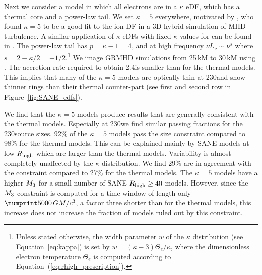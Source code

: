 Next we consider a model in which all electrons are in a $\kappa$ eDF, which has a thermal core and a power-law tail.
We set $\kappa = 5$ everywhere,  motivated by \citet{2016PhRvL.117w5101K}, who found $\kappa = 5$ to be a good fit to the ion DF in a 3D hybrid simulation of MHD turbulence.
A similar application of $\kappa$ eDFs with fixed $\kappa$ values for \sgra can be found in \citet{davelaar2018}.
The power-law tail has $p = \kappa - 1 = 4$, and at high frequency $\nu L_\nu \sim \nu^s$ where $s = 2 - \kappa/2 = -1/2$.\footnote{Unless stated otherwise, the width parameter $w$ of the $\kappa$ distribution (see Equation~\ref{eq:kappa}) is set by $w = (\kappa - 3) \Theta_e/\kappa$, where the dimensionless electron temperature $\Theta_e$ is computed according to Equation~(\ref{eq:rhigh_prescription}).}
We image \bhac GRMHD simulations from 25\,kM to 30\,kM using \bhoss \citep{Younsi2012,Younsi2020}.
The accretion rate required to obtain 2.4\Jy is smaller than for the thermal models.
This implies that many of the $\kappa=5$ models are optically thin at 230\GHz and show thinner rings than their thermal counter-part (see first and second row in Figure~\ref{fig:SANE_edfs}).


We find that the $\kappa=5$ models produce results that are generally consistent with the \bhac thermal models.
Especially at 230\GHz we find similar passing fractions for the 230\GHz source sizes.
92\% of the $\kappa=5$ models pass the size constraint compared to 98\% for the thermal models.
This can be explained mainly by SANE models at low $R_\mathrm{high}$ which are larger than the thermal models.
Variability is almost completely unaffected by the $\kappa$ distribution.
We find 29\% are in agreement with the  constraint compared to 27\% for the thermal models.
The $\kappa=5$ models have a higher $M_{3}$ for a small number of SANE $R_\mathrm{high} \geq 40$ models.
However, since the $M_{3}$ constraint is computed for a time window of length only $\no{5000}\,\tg$, a factor three shorter than for the thermal models, this increase does not increase the fraction of models ruled out by this constraint.

